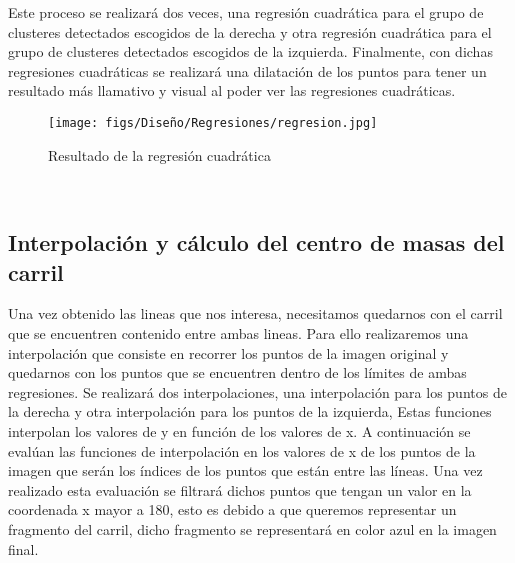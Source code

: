 Este proceso se realizará dos veces, una regresión cuadrática para el grupo de clusteres detectados escogidos de la derecha y otra regresión cuadrática para el grupo de clusteres detectados
escogidos de la izquierda. \newline
Finalmente, con dichas regresiones cuadráticas se realizará una dilatación de los puntos para tener un resultado más llamativo y visual al poder
ver las regresiones cuadráticas.\newline

\begin{figure} [H]
  \begin{center}
    \texttt{[image: figs/Diseño/Regresiones/regresion.jpg]}
  \end{center}
  \caption{Resultado de la regresión cuadrática}
  \label{fig:regresión cuadrática}
\end{figure}\

\subsection{Interpolación y cálculo del centro de masas del carril}
\label{sec:Interpolación y cálculo del centro de masas del carril}

Una vez obtenido las lineas que nos interesa, necesitamos quedarnos con el carril que se encuentren contenido entre ambas lineas. Para ello realizaremos una interpolación que consiste en recorrer
los puntos de la imagen original y quedarnos con los puntos que se encuentren dentro de los límites de ambas regresiones. Se realizará dos interpolaciones, una interpolación para los puntos de la derecha
y otra interpolación para los puntos de la izquierda, Estas funciones interpolan los valores de y en función de los valores de x. 
A continuación se evalúan las funciones de interpolación en los valores de x de los puntos de la imagen que serán los índices de los puntos que están entre las líneas. Una vez realizado esta evaluación
se filtrará dichos puntos que tengan un valor en la coordenada x mayor a 180, esto es debido a que queremos representar un fragmento del carril, dicho fragmento se representará en color azul 
en la imagen final.

